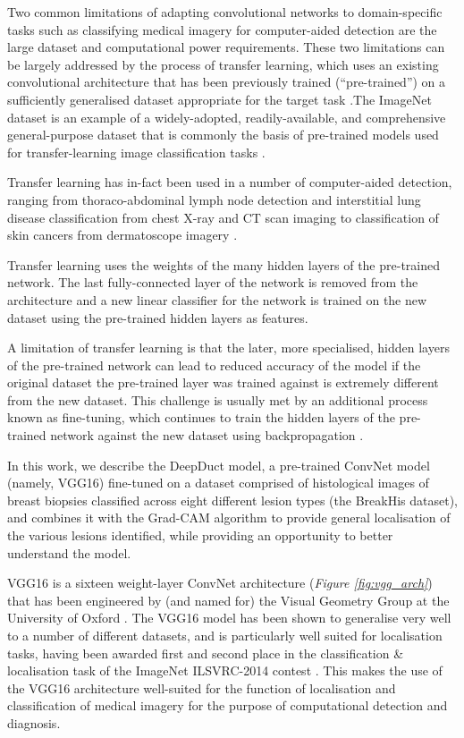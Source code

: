 Two common limitations of adapting convolutional networks to domain-specific tasks such as classifying medical imagery for computer-aided detection are the large dataset and computational power requirements. These two limitations can be largely addressed by the process of transfer learning, which uses an existing convolutional architecture that has been previously trained (``pre-trained'') on a sufficiently generalised dataset appropriate for the target task \citep{transfer_learning_survey}.The ImageNet dataset is an example of a widely-adopted, readily-available, and comprehensive general-purpose dataset that is commonly the basis of pre-trained models used for transfer-learning image classification tasks \citep{imagenet}.\par

Transfer learning has in-fact been used in a number of computer-aided detection, ranging from thoraco-abdominal lymph node detection and interstitial lung disease classification from chest X-ray and CT scan imaging to classification of skin cancers from dermatoscope imagery \citep{transfer_learning_lungs, transfer_learning_skin}.\par

Transfer learning uses the weights of the many hidden layers of the pre-trained network. The last fully-connected layer of the network is removed from the architecture and a new linear classifier for the network is trained on the new dataset using the pre-trained hidden layers as features.\par

A limitation of transfer learning is that the later, more specialised, hidden layers of the pre-trained network can lead to reduced accuracy of the model if the original dataset the pre-trained layer was trained against is extremely different from the new dataset. This challenge is usually met by an additional process known as fine-tuning, which continues to train the hidden layers of the pre-trained network against the new dataset using backpropagation \citep{yosinski2014}.\par

In this work, we describe the DeepDuct model, a pre-trained ConvNet model (namely, VGG16) fine-tuned on a dataset comprised of histological images of breast biopsies classified across eight different lesion types (the BreakHis dataset), and combines it with the Grad-CAM algorithm to provide general localisation of the various lesions identified, while providing an opportunity to better understand the model.\par

VGG16 is a sixteen weight-layer ConvNet architecture (\textit{Figure \ref{fig:vgg_arch}}) that has been engineered by (and named for) the Visual Geometry Group at the University of Oxford \citep{simonyan2014}. The VGG16 model has been shown to generalise very well to a number of different datasets, and is particularly well suited for localisation tasks, having been awarded first and second place in the classification \& localisation task of the ImageNet ILSVRC-2014 contest \citep{imagenet}. This makes the use of the VGG16 architecture well-suited for the function of localisation and classification of medical imagery for the purpose of computational detection and diagnosis.